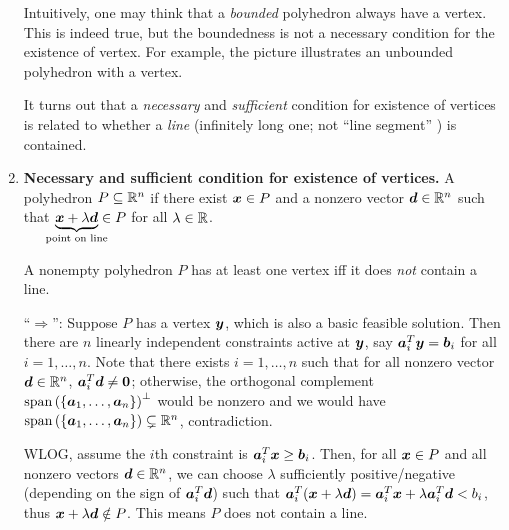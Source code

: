 \begin{enumerate}
Intuitively, one may think that a \emph{bounded} polyhedron always have a
vertex. This is indeed true, but the boundedness is not a necessary condition
for the existence of vertex. For example, the picture illustrates an unbounded
polyhedron with a vertex.
\begin{center}
\end{center}

It turns out that a \emph{necessary} and \emph{sufficient} condition for
existence of vertices is related to whether a \emph{line} (infinitely long one;
not ``line segment'' \warn{}) is contained.

\item \textbf{Necessary and sufficient condition for existence of vertices.}
A polyhedron \(P\subseteq \mathbb{R}^n\)  if there exist
\(\bm{x}\in P\) and a nonzero vector \(\bm{d}\in\mathbb{R}^n\) such that
\(\underbrace{\vect{x}+\lambda\vect{d}}_{\mathclap{\text{point on line}}}\in P\) for all \(\lambda\in\mathbb{R}\).

\begin{theorem}
\label{thm:vertex-exist-noline}
A nonempty polyhedron \(P\) has at least one vertex iff it does \emph{not}
contain a line.
\end{theorem}
\begin{pf}
``\(\Rightarrow\)'': Suppose \(P\) has a vertex \(\bm{y}\), which is also a
basic feasible solution. Then there are \(n\) linearly independent constraints
active at \(\bm{y}\), say \(\bm{a}_i^{T}\bm{y}=\bm{b}_i\) for all
\(i=1,\dotsc,n\). Note that there exists \(i=1,\dotsc,n\) such that for all
nonzero vector \(\bm{d}\in\mathbb{R}^n\), \(\bm{a}_i^{T}\bm{d}\ne\bm{0}\);
otherwise, the orthogonal complement
\(\operatorname{span}\left(\{\bm{a}_1,\dotsc,\bm{a}_n\}\right)^{\perp}\) would be nonzero and we
would have \(\operatorname{span}\left(\{\bm{a}_1,\dotsc,\bm{a}_n\}\right)\subsetneq \mathbb{R}^n\), contradiction.

WLOG, assume the \(i\)th constraint is \(\bm{a}_i^{T}\bm{x}\ge
\bm{b}_i\). Then, for all \(\bm{x}\in P\) and all nonzero vectors
\(\bm{d}\in\mathbb{R}^n\), we can choose \(\lambda\) sufficiently positive/negative
(depending on the sign of \(\bm{a}_i^{T}\bm{d}\)) such that
\(\bm{a}_i^{T}(\bm{x}+\lambda\bm{d})
=\bm{a}_i^{T}\bm{x}+\lambda\bm{a}_{i}^{T}\bm{d}<b_i\), thus
\(\bm{x}+\lambda\bm{d}\notin P\). This means \(P\) does not contain a line.


\end{pf}
\end{enumerate}
